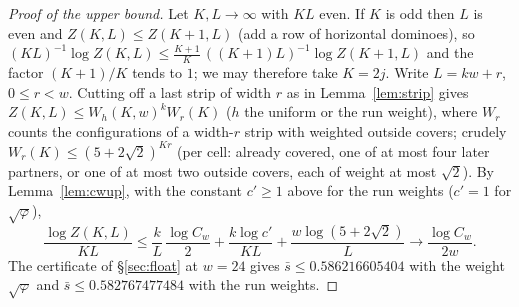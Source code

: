 \documentclass[11pt]{amsart}
\theoremstyle{definition}
\theoremstyle{remark}
\begin{document}
\begin{proof}[Proof of the upper bound]
Let $K, L \to \infty$ with $KL$ even. If $K$ is odd then $L$ is even and $Z(K, L) \le Z(K+1, L)$
(add a row of horizontal dominoes), so
$(KL)^{-1}\log Z(K, L) \le \frac{K+1}{K}\,((K+1)L)^{-1}\log Z(K+1, L)$ and the factor
$(K+1)/K$ tends to $1$; we may therefore take $K = 2j$. Write $L = kw + r$, $0 \le r < w$.
Cutting off a last strip of width $r$ as in Lemma~\ref{lem:strip} gives
$Z(K, L) \le W_h(K, w)^k W_r(K)$ ($h$ the uniform or the run weight), where $W_r$ counts the configurations of a width-$r$ strip with
weighted outside covers; crudely $W_r(K) \le (5 + 2\sqrt2)^{Kr}$ (per cell: already covered, one of
at most four later partners, or one of at most two outside covers, each of weight at most $\sqrt2$).
By Lemma~\ref{lem:cwup}, with the constant $c' \ge 1$ above for the run weights ($c' = 1$ for
$\sqrt\varphi$),
\[
  \frac{\log Z(K, L)}{KL} \le \frac{k}{L}\,\frac{\log C_w}{2} + \frac{k \log c'}{KL}
  + \frac{w \log(5 + 2\sqrt2)}{L} \longrightarrow \frac{\log C_w}{2w}.
\]
The certificate of \S\ref{sec:float} at $w = 24$ gives $\bar s \le 0.586216605404$ with the weight
$\sqrt\varphi$ and $\bar s \le 0.582767477484$ with the run weights.
\end{proof}
\end{document}
